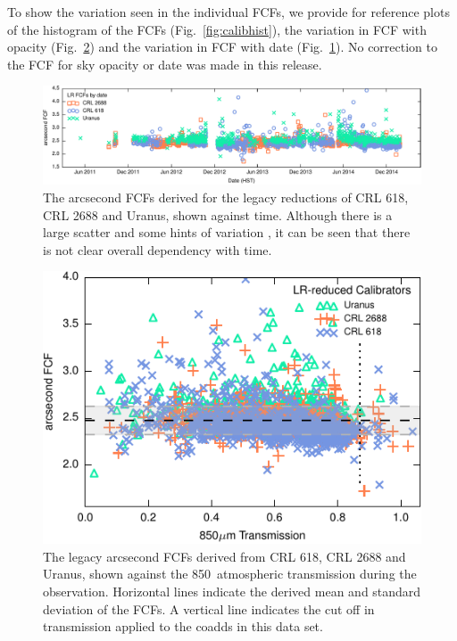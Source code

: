 \documentclass[twocolumn]{aastex6}
\begin{document}
To show the variation seen in the individual FCFs, we provide for
reference plots of the histogram of the FCFs
(Fig.~\ref{fig:calibhist}), the variation in FCF with opacity
(Fig.~\ref{fig:calibvstrans}) and the variation in FCF with date
(Fig.~\ref{fig:calibvstime}). No correction to the FCF for sky opacity or date
was made in this release.

\begin{figure}
\includegraphics{legacyFCF-vs-date.pdf}
\caption{The arcsecond FCFs derived for the legacy reductions of CRL
  618, CRL 2688 and Uranus, shown against time. Although there is a
  large scatter and some hints of variation , it can be seen that there is not
  clear overall dependency with time.\label{fig:calibvstime}}
\end{figure}
\begin{figure}
\includegraphics{legacyFCF-vs-transmission.pdf}
\caption{The legacy arcsecond FCFs derived from CRL 618, CRL 2688 and
  Uranus, shown against the 850\micron\ atmospheric transmission
  during the observation. Horizontal lines indicate the derived mean
  and standard deviation of the FCFs. A vertical line indicates the
  cut off in transmission applied to the coadds in this data
  set. \label{fig:calibvstrans}}
\end{figure}
\end{document}
